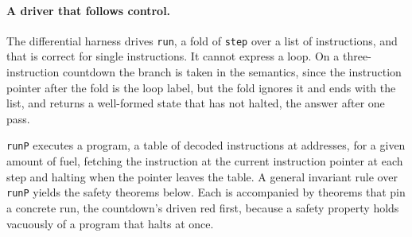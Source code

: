 \documentclass[runningheads]{llncs}
\newcommand{\src}[1]{}  %
\newcommand{\lean}[1]{\texttt{#1}}
\begin{document}
\paragraph{A driver that follows control.}
The differential harness drives \lean{run}, a fold of \lean{step} over a list of instructions, and that
is correct for single instructions. It cannot express a loop. On a three-instruction countdown the
branch is taken in the semantics, since the instruction pointer after the fold is the loop label, but
the fold ignores it and ends with the list, and returns a well-formed state that has not
halted, the answer after one pass.
\src{docs/P2-PROOF-INTERFACE.md, the finding before either design question: ecx 2, rip at the label,
no halt}
\lean{runP} executes a program, a table of decoded instructions at addresses, for a given amount of
fuel, fetching the instruction at the current instruction pointer at each step and halting when the
pointer leaves the table. A general invariant rule over \lean{runP} yields the safety theorems below.
Each is accompanied by theorems that pin a concrete run, the countdown's driven red first, because a
safety property holds vacuously of a program that halts at once.
\src{X86/Program.lean runP, runP\_invariant, runP\_safe; Tests/Program.lean, the nonvacuity theorems: countdown\_really\_ran, fill\_really\_wrote, memcpy\_really\_copies, scan\_really\_ran,
prologue\_really\_pushed, guarded\_stores\_in\_bounds and guarded\_out\_of\_bounds\_ran}
\end{document}
